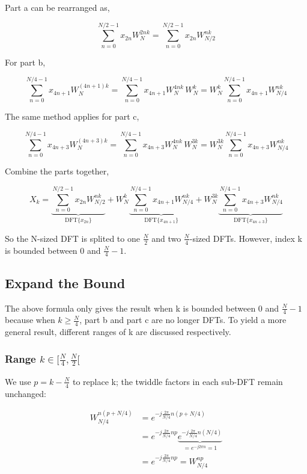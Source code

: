 \documentclass[a4paper]{report}
\begin{document}
	Part a can be rearranged as,
	
	\[\sum^{N/2-1}_{n=0} x_{2n} W_{N}^{2nk} = \sum^{N/2-1}_{n=0} x_{2n} W_{N/2}^{nk}\]
	
	For part b,
	
	\[\sum^{N/4-1}_{n=0} x_{4n+1} W_{N}^{(4n+1)k}
	= \sum^{N/4-1}_{n=0} x_{4n+1} W_{N}^{4nk} \, W_{N}^{k}
	= W_{N}^{k}\sum^{N/4-1}_{n=0} x_{4n+1} W_{N/4}^{nk}\]
	
	The same method applies for part c,
	
	\[\sum^{N/4-1}_{n=0} x_{4n+3} W_{N}^{(4n+3)k}
	= \sum^{N/4-1}_{n=0} x_{4n+3} W_{N}^{4nk} \, W_{N}^{3k}
	= W_{N}^{3k}\sum^{N/4-1}_{n=0} x_{4n+3} W_{N/4}^{nk}\]
	
	Combine the parts together,
	
	\[X_k = \underbrace{\sum_{n=0}^{N/2-1} x_{2n} W_{N/2}^{nk}}_{\text{DFT}\{x_{2n}\}}
          + W_N^k \underbrace{\sum_{n=0}^{N/4-1} x_{4n+1} W_{N/4}^{nk}}_{\text{DFT}\{x_{4n+1}\}}
          + W_N^{3k} \underbrace{\sum_{n=0}^{N/4-1} x_{4n+3} W_{N/4}^{nk}}_{\text{DFT}\{x_{4n+3}\}}\]
	
	So the N-sized DFT is splited to one $\frac{N}{2}$ and two $\frac{N}{4}$-sized DFTs. However, index k is bounded between 0 and $\frac{N}{4}-1$.

\subsection{Expand the Bound} \indent

	The above formula only gives the result when k is bounded between 0 and $\frac{N}{4}-1$ because when $k \geq \frac{N}{4}$, part b and part c are no longer DFTs. To yield a more general result, different ranges of k are discussed respectively.

\subsubsection{Range $k \in [\frac{N}{4}, \frac{N}{2}[$} \indent

	We use $p = k - \frac{N}{4}$ to replace k; the twiddle factors in each sub-DFT remain unchanged:
	
	\[\begin{split}
	W_{N/4}^{n(p+N/4)} & = e^{-j\frac{2\pi}{N/4}n(p+N/4)} \\
					   & = e^{-j\frac{2\pi}{N/4}np} \underbrace{e^{-j\frac{2\pi}{N/4}n(N/4)}}_{= e^{-j2\pi n} = 1} \\
					   & = e^{-j\frac{2\pi}{N/4}np} = W_{N/4}^{np}
	\end{split}\]
\end{document}
